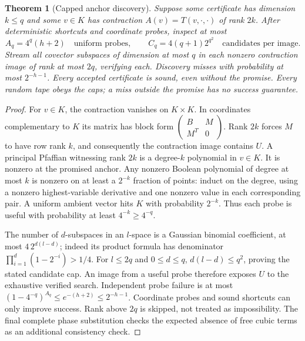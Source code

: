 \documentclass[11pt]{article}
\newtheorem{theorem}{Theorem}[section]
\begin{document}
\begin{theorem}[Capped anchor discovery]\label{thm:discovery}
Suppose some certificate has dimension $k\leq q$ and some $v\in K$ has contraction
$A(v)=T(v,\cdot,\cdot)$ of rank $2k$. After deterministic shortcuts and coordinate
probes, inspect at most
\begin{equation}\label{eq:discoverycost}
 A_q=4^q(h+2)\quad\text{uniform probes},\qquad
 C_q=4(q+1)2^{q^2}\quad\text{candidates per image}.
\end{equation}
Stream all covector subspaces of dimension at most $q$ in each nonzero contraction
image of rank at most $2q$, verifying each. Discovery misses with probability at most
$2^{-h-1}$. Every accepted certificate is sound, even without the promise. Every
random tape obeys the caps; a miss outside the promise has no success guarantee.
\end{theorem}
\begin{proof}
For $v\in K$, the contraction vanishes on $K\times K$. In coordinates complementary
to $K$ its matrix has block form $\left(\begin{smallmatrix}B&M\\M^T&0\end{smallmatrix}\right)$.
Rank $2k$ forces $M$ to have row rank $k$, and consequently the contraction image
contains $U$. A principal Pfaffian witnessing rank $2k$ is a degree-$k$ polynomial
in $v\in K$. It is nonzero at the promised anchor. Any nonzero Boolean polynomial
of degree at most $k$ is nonzero on at least a $2^{-k}$ fraction of points: induct on
the degree, using a nonzero highest-variable derivative and one nonzero value in
each corresponding pair. A uniform ambient vector hits $K$ with probability $2^{-k}$.
Thus each probe is useful with probability at least $4^{-k}\geq4^{-q}$.

The number of $d$-subspaces in an $l$-space is a Gaussian binomial coefficient,
at most $4\,2^{d(l-d)}$; indeed its product formula has denominator
$\prod_{i=1}^d(1-2^{-i})>1/4$. For $l\leq2q$ and $0\leq d\leq q$,
$d(l-d)\leq q^2$, proving the stated candidate cap. An image from a useful probe
therefore exposes $U$ to the exhaustive verified search. Independent probe failure is
at most $(1-4^{-q})^{A_q}\leq e^{-(h+2)}\leq2^{-h-1}$.
Coordinate probes and sound shortcuts can only improve success. Rank above $2q$
is skipped, not treated as impossibility. The final complete phase substitution
checks the expected absence of free cubic terms as an additional consistency check.
\end{proof}
\end{document}
